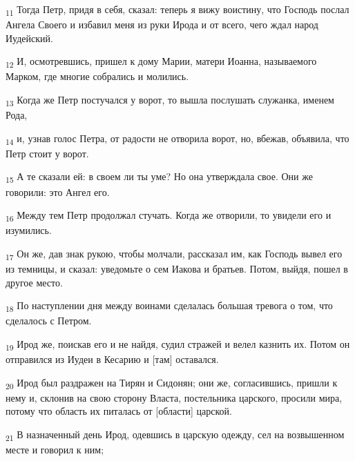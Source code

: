 \begin{tcolorbox}
\textsubscript{11} Тогда Петр, придя в себя, сказал: теперь я вижу воистину, что Господь послал Ангела Своего и избавил меня из руки Ирода и от всего, чего ждал народ Иудейский.
\end{tcolorbox}
\begin{tcolorbox}
\textsubscript{12} И, осмотревшись, пришел к дому Марии, матери Иоанна, называемого Марком, где многие собрались и молились.
\end{tcolorbox}
\begin{tcolorbox}
\textsubscript{13} Когда же Петр постучался у ворот, то вышла послушать служанка, именем Рода,
\end{tcolorbox}
\begin{tcolorbox}
\textsubscript{14} и, узнав голос Петра, от радости не отворила ворот, но, вбежав, объявила, что Петр стоит у ворот.
\end{tcolorbox}
\begin{tcolorbox}
\textsubscript{15} А те сказали ей: в своем ли ты уме? Но она утверждала свое. Они же говорили: это Ангел его.
\end{tcolorbox}
\begin{tcolorbox}
\textsubscript{16} Между тем Петр продолжал стучать. Когда же отворили, то увидели его и изумились.
\end{tcolorbox}
\begin{tcolorbox}
\textsubscript{17} Он же, дав знак рукою, чтобы молчали, рассказал им, как Господь вывел его из темницы, и сказал: уведомьте о сем Иакова и братьев. Потом, выйдя, пошел в другое место.
\end{tcolorbox}
\begin{tcolorbox}
\textsubscript{18} По наступлении дня между воинами сделалась большая тревога о том, что сделалось с Петром.
\end{tcolorbox}
\begin{tcolorbox}
\textsubscript{19} Ирод же, поискав его и не найдя, судил стражей и велел казнить их. Потом он отправился из Иудеи в Кесарию и [там] оставался.
\end{tcolorbox}
\begin{tcolorbox}
\textsubscript{20} Ирод был раздражен на Тирян и Сидонян; они же, согласившись, пришли к нему и, склонив на свою сторону Власта, постельника царского, просили мира, потому что область их питалась от [области] царской.
\end{tcolorbox}
\begin{tcolorbox}
\textsubscript{21} В назначенный день Ирод, одевшись в царскую одежду, сел на возвышенном месте и говорил к ним;
\end{tcolorbox}
